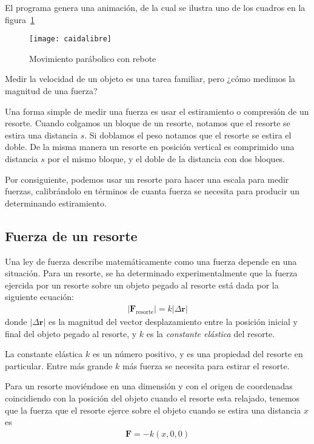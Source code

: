 \begin{frame}
  El programa genera una animación, de la cual  se ilustra uno de los cuadros en la figura~\ref{fig:caidalibre}
  \begin{figure}
    \centering
    \texttt{[image: caidalibre]}
    \caption{Movimiento parábolico con rebote}
    \label{fig:caidalibre}
  \end{figure}

\end{frame}


Medir la velocidad de un objeto es una tarea familiar, pero ¿cómo
medimos la magnitud de una fuerza?

Una forma simple de medir una fuerza es usar el estiramiento o
compresión de un resorte. 
Cuando colgamos un bloque de un resorte, notamos que el resorte se
estira una distancia $s$.  
Si doblamos el peso notamos que el resorte se estira el doble. 
De la misma manera un resorte en posición vertical es comprimido una
distancia $s$ por el mismo bloque, y el doble de la distancia con dos
bloques.

Por consiguiente, podemos usar un resorte para hacer una escala para
medir fuerzas, calibrándolo en términos de cuanta fuerza se necesita
para producir un determinando estiramiento.
 
\subsection{Fuerza de un resorte}

Una ley de fuerza describe matemáticamente como una fuerza depende en una situación. Para un resorte, se ha determinado experimentalmente que la fuerza ejercida por un resorte sobre un objeto pegado al resorte está dada por la siguiente ecuación:
\begin{align}
  \left| \mathbf{F}_{\text{resorte}} \right|=k|\Delta \mathbf{r}|
\end{align}
donde $|\Delta \mathbf{r}|$ es la magnitud del vector desplazamiento entre la posición inicial y final del objeto pegado al resorte, y $k$ es la \emph{constante elástica} del resorte. 

La constante elástica $k$ es un número positivo, y es una propiedad del resorte en particular. Entre más grande $k$ más fuerza se necesita para estirar el resorte. 

Para un resorte moviéndose en una dimensión y con el origen de coordenadas coincidiendo con la posición del objeto cuando el resorte esta relajado, tenemos que la fuerza que el resorte ejerce sobre el objeto cuando se estira una distancia $x$ es
\begin{align}
  \mathbf{F}=-k(x,0,0)
\end{align}


